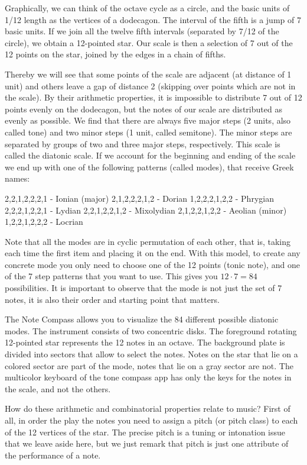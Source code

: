 Graphically, we can think of the octave cycle as a circle, and the basic units of 1/12 length as the vertices of a dodecagon. The interval of the fifth is a jump of 7 basic units. If we join all the twelve fifth intervals (separated by 7/12 of the circle), we obtain a 12-pointed star. Our scale is then a selection of 7 out of the 12 points on the star, joined by the edges in a chain of fifths. 

Thereby we will see that some points of the scale are adjacent (at distance of 1 unit) and others  leave  a gap of distance 2 (skipping over points which are not in the scale). By their arithmetic properties, it is impossible to distribute 7 out of  12 points evenly on the dodecagon, but the notes of our scale are distributed as evenly as possible. We find that there are always five major steps (2 units, also called tone) and two minor steps (1 unit, called semitone). The minor steps are separated by groups of two and three major steps, respectively. This scale is called the diatonic scale. If we account for the beginning and ending of the scale we end up with one of the following patterns (called modes), that receive Greek names:

	2,2,1,2,2,2,1 - Ionian (major)
	2,1,2,2,2,1,2 - Dorian
	1,2,2,2,1,2,2 - Phrygian
	2,2,2,1,2,2,1 - Lydian
	2,2,1,2,2,1,2 - Mixolydian
	2,1,2,2,1,2,2 - Aeolian (minor)
	1,2,2,1,2,2,2 - Locrian

Note that all the modes are in cyclic permutation of each other, that is, taking each time the first item and placing it on the end. With this model, to create any concrete mode you only need to choose one of the 12 points (tonic note), and one of the 7 step patterns that you want to use. This gives you $12\cdot 7=84$ possibilities. It is important to observe that the mode is not just the set of 7 notes, it is also their order and starting point that matters.

The Note Compass allows you to visualize the 84 different possible diatonic modes. The instrument consists of two concentric disks. The foreground rotating 12-pointed star represents the 12 notes in an octave. The background plate is divided into sectors that allow to select the notes. Notes on the star that lie on a colored sector are part of the mode, notes that lie on a gray sector are not. The multicolor keyboard of the tone compass app has only the keys for the notes in the scale, and not the others.

How do these arithmetic and combinatorial properties relate to music? First of all, in order the play the notes you need to assign a pitch (or pitch class) to each of the 12 vertices of the star. The precise pitch is a tuning or intonation issue that we leave aside here, but we just remark that pitch is just one attribute of the performance of a note. 


